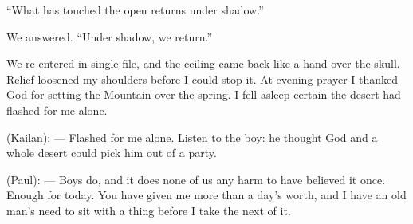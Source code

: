 ``What has touched the open returns under shadow.''\par
We answered. ``Under shadow, we return.''\par

We re-entered in single file, and the ceiling came back like a hand over the skull. Relief loosened my shoulders before I could stop it. At evening prayer I thanked God for setting the Mountain over the spring. I fell asleep certain the desert had flashed for me alone.\par

\begin{room}

(Kailan): --- Flashed for me alone. Listen to the boy: he thought God and a whole desert could pick him out of a party.

(Paul): --- Boys do, and it does none of us any harm to have believed it once. Enough for today. You have given me more than a day's worth, and I have an old man's need to sit with a thing before I take the next of it.

\end{room}
